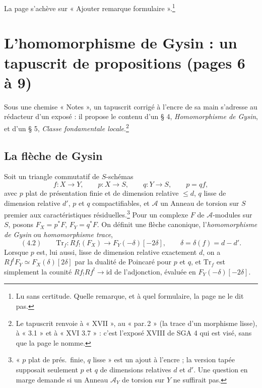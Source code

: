 \documentclass[11pt,a4paper]{article}
\begin{document}
La page s'achève sur « Ajouter remarque formulaire ».\footnote{Lu sans
certitude. Quelle remarque, et à quel formulaire, la page ne le dit pas.}

\section*{L'homomorphisme de Gysin : un tapuscrit de propositions (pages 6 à 9)}

Sous une chemise « Notes », un tapuscrit corrigé à l'encre de sa main
s'adresse au rédacteur d'un exposé : il propose le contenu d'un § 4,
\emph{Homomorphisme de Gysin}, et d'un § 5, \emph{Classe fondamentale
locale}.\footnote{Le tapuscrit renvoie à « XVII », au « par.\,2 » (la trace
d'un morphisme lisse), à « 3.1 » et à « XVI 3.7 » : c'est l'exposé XVIII de
SGA 4 qui est visé, sans que la page le nomme.}

\subsection*{La flèche de Gysin}

Soit un triangle commutatif de $S$-schémas
\[
f\colon X \to Y, \qquad p\colon X \to S, \qquad q\colon Y \to S, \qquad p = q f,
\]
avec $p$ plat de présentation finie et de dimension relative $\leqslant d$,
$q$ lisse de dimension relative $d'$, $p$ et $q$ compactifiables, et
$\mathcal{A}$ un Anneau de torsion sur $S$ premier aux caractéristiques
résiduelles.\footnote{« $p$ plat de prés.\ finie, $q$ lisse » est un ajout à
l'encre ; la version tapée supposait seulement $p$ et $q$ de dimensions
relatives $d$ et $d'$. Une question en marge demande si un Anneau
$\mathcal{A}_Y$ de torsion sur $Y$ ne suffirait pas.} Pour un complexe $F$ de
$\mathcal{A}$-modules sur $S$, posons $F_X = p^*F$, $F_Y = q^*F$. On définit
une flèche canonique, l'\emph{homomorphisme de Gysin} ou \emph{homomorphisme
trace},
\[
(4.2)\qquad \mathrm{Tr}_f\colon Rf_!(F_X) \longrightarrow F_Y(-\delta)[-2\delta],
\qquad \delta = \delta(f) = d - d'.
\]
Lorsque $p$ est, lui aussi, lisse de dimension relative exactement $d$, on a
$Rf^!F_Y \simeq F_X(\delta)[2\delta]$ par la dualité de Poincaré pour $p$ et
$q$, et $\mathrm{Tr}_f$ est simplement la counité $Rf_!Rf^! \to \mathrm{id}$
de l'adjonction, évaluée en $F_Y(-\delta)[-2\delta]$.
\end{document}
